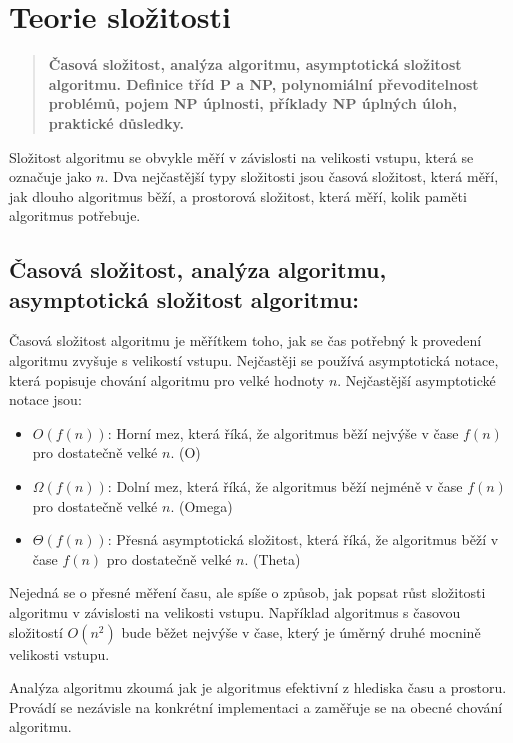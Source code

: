 \section{Teorie složitosti}
\begin{quote}
\textbf{Časová složitost, analýza algoritmu, asymptotická složitost algoritmu. Definice tříd P a NP, polynomiální převoditelnost problémů, pojem NP úplnosti, příklady NP úplných úloh, praktické důsledky.}
\end{quote}

Složitost algoritmu se obvykle měří v závislosti na velikosti vstupu, která se 
označuje jako $n$. Dva nejčastější typy složitosti jsou časová složitost, která měří, 
jak dlouho algoritmus běží, a prostorová složitost, která měří, kolik paměti 
algoritmus potřebuje.

\subsection{Časová složitost, analýza algoritmu, asymptotická složitost algoritmu:} 
Časová složitost algoritmu je měřítkem toho, jak se čas potřebný k provedení algoritmu zvyšuje s velikostí vstupu.
Nejčastěji se používá asymptotická notace, která popisuje chování algoritmu pro velké hodnoty $n$. Nejčastější asymptotické notace jsou:
\begin{itemize}
\item $O(f(n))$: Horní mez, která říká, že algoritmus běží nejvýše v čase $f(n)$ pro dostatečně velké $n$. (O)
\item $\Omega(f(n))$: Dolní mez, která říká, že algoritmus běží nejméně v čase $f(n)$ pro dostatečně velké $n$. (Omega)
\item $\Theta(f(n))$: Přesná asymptotická složitost, která říká, že algoritmus běží v čase $f(n)$ pro dostatečně velké $n$. (Theta)
\end{itemize}

Nejedná se o přesné měření času, ale spíše o způsob, jak popsat růst složitosti 
algoritmu v závislosti na velikosti vstupu. Například algoritmus s časovou 
složitostí $O(n^2)$ bude běžet nejvýše v čase, který je úměrný druhé mocnině 
velikosti vstupu. 

Analýza algoritmu zkoumá jak je algoritmus efektivní z hlediska času a prostoru.
Provádí se nezávisle na konkrétní implementaci a zaměřuje se na obecné chování algoritmu.

